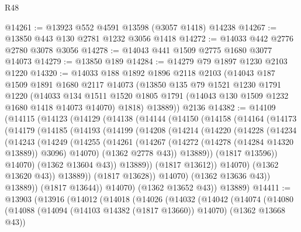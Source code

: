 \begin{lexlean}{R48}
\begin{coremodule}
@14261 := @13923 @552 @4591 @13598 (@3057 @1418) @14238
@14267 := @13850 @443 @130 @2781 @1232 @3056 @1418
@14272 := @14033 @442 @2776 @2780 @3078 @3056
@14278 := @14043 @441 @1509 @2775 @1680 @3077 @14073
@14279 := @13850 @189
@14284 := @14279 @79 @1897 @1230 @2103 @1220
@14320 := @14033
    @188
    @1892
    @1896
    @2118
    @2103
    (@14043
      @187
      @1509
      @1891
      @1680
      @2117
      @14073
      (@13850
        @135
        @79
        @1521
        @1230
        @1791
        @1220
        (@14033
          @134
          @1511
          @1520
          @1805
          @1791
          (@14043 @130 @1509 @1232 @1680 @1418 @14073 @14070)
          @1818)
        @13889))
    @2136
@14382 := @14109
    (@14115
      (@14123
        (@14129
          (@14138
            (@14144
              (@14150
                (@14158
                  (@14164
                    (@14173
                      (@14179
                        (@14185
                          (@14193
                            (@14199
                              (@14208
                                (@14214
                                  (@14220
                                    (@14228
                                      (@14234
                                        (@14243
                                          (@14249
                                            (@14255
                                              (@14261
                                                (@14267
                                                  (@14272 (@14278 (@14284 @14320 @13889)) @3096)
                                                  @14070)
                                                (@1362 @2778 @43))
                                              @13889))
                                          (@1817 @13596))
                                        @14070)
                                      (@1362 @13604 @43))
                                    @13889))
                                (@1817 @13612))
                              @14070)
                            (@1362 @13620 @43))
                          @13889))
                      (@1817 @13628))
                    @14070)
                  (@1362 @13636 @43))
                @13889))
            (@1817 @13644))
          @14070)
        (@1362 @13652 @43))
      @13889)
@14411 := @13903
    (@13916
      (@14012
        (@14018
          (@14026
            (@14032
              (@14042
                (@14074
                  (@14080
                    (@14088 (@14094 (@14103 @14382 (@1817 @13660)) @14070) (@1362 @13668 @43))

\end{coremodule}
\end{lexlean}
